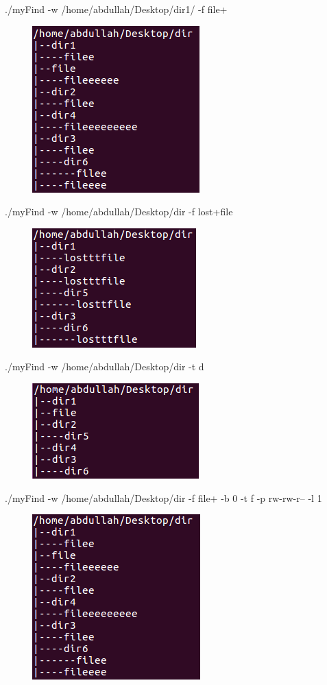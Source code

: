 \documentclass{article}
\begin{document}
./myFind -w /home/abdullah/Desktop/dir1/ -f file+
\begin{figure}[h]
	\centering
	\includegraphics[scale=0.5]{t2.png}
\end{figure}

\newpage
./myFind -w /home/abdullah/Desktop/dir -f lost+file
\begin{figure}[h]
	\centering
	\includegraphics[scale=0.5]{t3.png}
\end{figure}

./myFind -w /home/abdullah/Desktop/dir -t d
\begin{figure}[h]
	\centering
	\includegraphics[scale=0.5]{t4.png}
\end{figure}

./myFind -w /home/abdullah/Desktop/dir -f file+ -b 0 -t f -p rw-rw-r-- -l 1
\begin{figure}[h]
	\centering
	\includegraphics[scale=0.5]{t5.png}
\end{figure}
\end{document}
